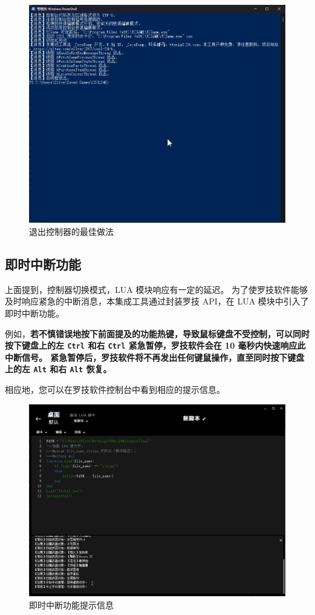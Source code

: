 \begin{figure}[H]
    \Centering
    \includegraphics[width=\textwidth]{docs/assets/exit_controller.png}
    \caption{退出控制器的最佳做法}
\end{figure}

\subsection{即时中断功能}

上面提到，控制器切换模式，LUA 模块响应有一定的延迟。
为了使罗技软件能够及时响应紧急的中断消息，本集成工具通过封装罗技 API，在 LUA 模块中引入了即时中断功能。

例如，\textbf{\color{red}若不慎错误地按下前面提及的功能热键，导致鼠标键盘不受控制，可以同时按下键盘上的左 \lstinline{Ctrl} 和右 \lstinline{Ctrl} 紧急暂停，罗技软件会在 10 毫秒内快速响应此中断信号。
紧急暂停后，罗技软件将不再发出任何键鼠操作，直至同时按下键盘上的左 \lstinline{Alt} 和右 \lstinline{Alt} 恢复。}

相应地，您可以在罗技软件控制台中看到相应的提示信息。

\begin{figure}[H]
    \Centering
    \includegraphics[width=\textwidth]{docs/assets/interrupt.png}
    \caption{即时中断功能提示信息}
\end{figure}

